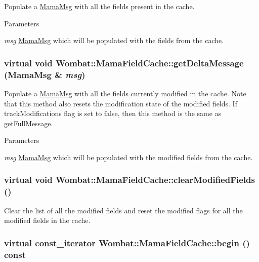 Populate a \hyperlink{classWombat_1_1MamaMsg}{MamaMsg} with all the fields present in the cache. 
\begin{DoxyParams}{Parameters}
\item[{\em msg}]\hyperlink{classWombat_1_1MamaMsg}{MamaMsg} which will be populated with the fields from the cache. \end{DoxyParams}
\hypertarget{classWombat_1_1MamaFieldCache_a723a5a3df4a735cccb815c8741036cb6}{
\subsubsection[{getDeltaMessage}]{\setlength{\rightskip}{0pt plus 5cm}virtual void Wombat::MamaFieldCache::getDeltaMessage ({\bf MamaMsg} \& {\em msg})}}
\label{classWombat_1_1MamaFieldCache_a723a5a3df4a735cccb815c8741036cb6}


Populate a \hyperlink{classWombat_1_1MamaMsg}{MamaMsg} with all the fields currently modified in the cache. Note that this method also resets the modification state of the modified fields. If trackModifications flag is set to false, then this method is the same as {\ttfamily getFullMessage}.


\begin{DoxyParams}{Parameters}
\item[{\em msg}]\hyperlink{classWombat_1_1MamaMsg}{MamaMsg} which will be populated with the modified fields from the cache. \end{DoxyParams}
\hypertarget{classWombat_1_1MamaFieldCache_a0e1b3f9a665da4328b799e8202c2764b}{
\subsubsection[{clearModifiedFields}]{\setlength{\rightskip}{0pt plus 5cm}virtual void Wombat::MamaFieldCache::clearModifiedFields ()}}
\label{classWombat_1_1MamaFieldCache_a0e1b3f9a665da4328b799e8202c2764b}


Clear the list of all the modified fields and reset the modified flags for all the modified fields in the cache. \hypertarget{classWombat_1_1MamaFieldCache_a55396aaa405bddacc892dc71a2b3a09b}{
\subsubsection[{begin}]{\setlength{\rightskip}{0pt plus 5cm}virtual {\bf const\_\-iterator} Wombat::MamaFieldCache::begin () const}}
\label{classWombat_1_1MamaFieldCache_a55396aaa405bddacc892dc71a2b3a09b}


